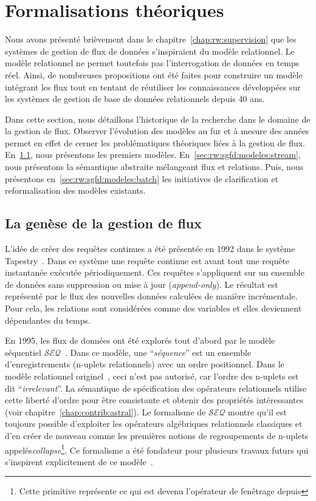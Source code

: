 \section{Formalisations théoriques}\label{sec:rw:sgfd:modeles}
Nous avons présenté brièvement dans le chapitre~\ref{chap:rw:supervision} que les systèmes de gestion de flux de données s'inspiraient du modèle relationnel. Le modèle relationnel ne permet toutefois pas l'interrogation de données en temps réel. Ainsi, de nombreuses propositions ont été faites pour construire un modèle intégrant les flux tout en tentant de réutiliser les connaissances développées sur les systèmes de gestion de base de données relationnels depuis 40 ans.

Dans cette section, nous détaillons l'historique de la recherche dans le domaine de la gestion de flux. Observer l'évolution des modèles au fur et à mesure des années permet en effet de cerner les problématiques théoriques liées à la gestion de flux. En~\ref{sec:rw:sgfd:modeles:early}, nous présentons les premiers modèles. En~\ref{sec:rw:sgfd:modeles:stream}, nous présentons la sémantique abstraite mélangeant flux et relations. Puis, nous présentons en~\ref{sec:rw:sgfd:modeles:batch} les initiatives de clarification et reformalisation des modèles existants.

\subsection{La genèse de la gestion de flux}\label{sec:rw:sgfd:modeles:early}
L'idée de créer des requêtes continues a été présentée en 1992 dans le système Tapestry~\cite{Terry:tapestry}. Dans ce système une requête continue est avant tout une requête instantanée exécutée périodiquement. Ces requêtes s'appliquent sur un ensemble de données sans suppression ou mise à jour (\textit{append-only}). Le résultat est représenté par le flux des nouvelles données calculées de manière incrémentale. Pour cela, les relations sont considérées comme des variables et elles deviennent dépendantes du temps.

En 1995, les flux de données ont été explorés tout d'abord par le modèle séquentiel $\mathcal{SEQ}$~\cite{Seshadri:seq}. Dans ce modèle, une \enquote{\it séquence} est un ensemble d'enregistrements (n-uplets relationnels) avec un ordre positionnel. Dans le modèle relationnel originel~\cite{Codd:model}, ceci n'est pas autorisé, car l'ordre des n-uplets est dit \enquote{\it irrelevant}. La sémantique de spécification des opérateurs relationnels utilise cette liberté d'ordre pour être consistante et obtenir des propriétés intéressantes (voir chapitre~\ref{chap:contrib:astral}). Le formalisme de $\mathcal{SEQ}$ montre qu'il est toujours possible d'exploiter les opérateurs algébriques relationnels classiques et d'en créer de nouveau comme les premières notions de regroupements de n-uplets appelés\textit{collapse}\footnote{Cette primitive représente ce qui est devenu l'opérateur de fenêtrage depuis}. Ce formalisme a été fondateur pour plusieurs travaux futurs qui s'inspirent explicitement de ce modèle~\cite{Gurgen:sstreamware,Babcock:issues}.

